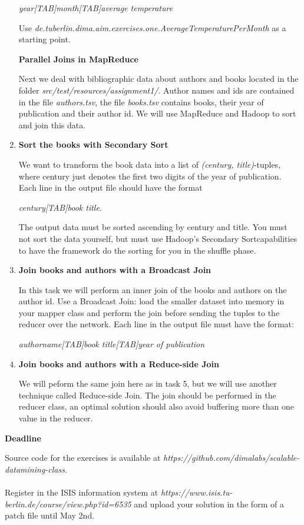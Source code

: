 \documentclass[11pt,a4paper]{article}
\begin{document}
\begin{enumerate}
\textit{year[TAB]month[TAB]average temperature}

Use \textit{de.tuberlin.dima.aim.exercises.one.AverageTemperaturePerMonth} as a starting point.

\newpage
\centerline{\textbf{Parallel Joins in MapReduce}}

Next we deal with bibliographic data about authors and books located in the folder \textit{src/test/resources/assignment1/}. Author names and ids are contained in the file \textit{authors.tsv}, the file \textit{books.tsv} contains books,  their year of publication and their author id. We will use MapReduce and Hadoop to sort and join this data.

\item \textbf{Sort the books with \dq{}Secondary Sort\dq}

We want to transform the book data into a list of \textit{(century, title)}-tuples, where century just denotes the first two digits of the year of publication. Each line in the output file should have the format

\textit{century[TAB]book title}.

The output data must be sorted ascending by century and title. You must not sort the data yourself, but must use Hadoop's \dq{}Secondary Sort\dq capabilities to have the framework do the sorting for you in the shuffle phase.

\item \textbf{Join books and authors with a \dq{}Broadcast Join\dq}

In this task we will perform an inner join of the books and authors on the author id. Use a \dq{}Broadcast Join\dq: load the smaller dataset into memory in your mapper class and perform the join before sending the tuples to the reducer over the network. Each line in the output file must have the format:

\textit{authorname[TAB]book title[TAB]year of publication}


\item \textbf{Join books and authors with a \dq{}Reduce-side Join\dq}

We will peform the same join here as in task 5, but we will use another technique called \dq{}Reduce-side Join\dq. The join should be performed in the reducer class, an optimal solution should also avoid buffering more than one value in the reducer.

\end{enumerate}

\bigskip
\centerline{\textbf{Deadline}}
\bigskip

Source code for the exercises is available at \textit{https://github.com/dimalabs/scalable-datamining-class}. 
\\
\\
Register in the ISIS information system at \textit{https://www.isis.tu-berlin.de/course/view.php?id=6535} and upload your solution in the form of a patch file until May 2nd.
\end{document}
